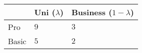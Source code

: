 \documentclass[]{standalone}
\begin{document}
\centering
\begin{tabular}{>{\centering\arraybackslash}p{1.5cm} | >{\centering\arraybackslash}p{1.5cm} | >{\centering\arraybackslash}p{2.3cm} }
 & \small Uni ($\lambda$)& \small Business ($1-\lambda$) \\
 \hline
Pro & $9$ & $3$ \\
 \hline
Basic & $5$ & $2$
\end{tabular}
\end{document}
